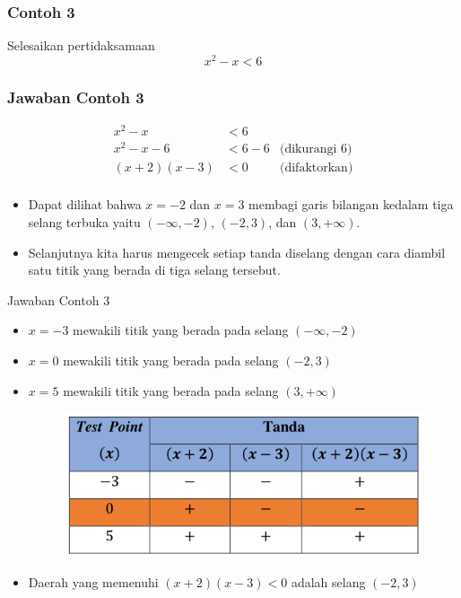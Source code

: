 \documentclass[pdflatex,compress,mathserif]{beamer}
\begin{document}
		\begin{frame}
			\frametitle{Contoh 3}
			Selesaikan pertidaksamaan 
			\begin{equation*}
				x^2 - x < 6
			\end{equation*}
		\end{frame}
	
		\begin{frame}
			\frametitle{Jawaban Contoh 3}
			\begin{align*}
				x^2 - x &< 6 &\\
				x^2 - x - 6 & < 6 - 6 & \text{(dikurangi 6)}\\
				(x+2)(x-3)& <  0 &\text{(difaktorkan)}\\
			\end{align*}
			\begin{itemize}
				\item Dapat dilihat bahwa $ x = -2 $ dan $ x = 3 $ membagi garis bilangan kedalam tiga selang terbuka yaitu $ (-\infty, -2) $, $ (-2,3) $, dan $ (3, +\infty) $.
				\item Selanjutnya kita harus mengecek setiap tanda diselang dengan cara diambil satu titik yang berada di tiga selang tersebut.
			\end{itemize}
		\end{frame}
	
		\begin{frame}{Jawaban Contoh 3}
			\begin{itemize}
				\item $ x = -3 $ mewakili titik yang berada pada selang $ (-\infty, -2) $
				\item $ x = 0 $ mewakili titik yang berada pada selang $ (-2, 3) $
				\item $ x = 5 $ mewakili titik yang berada pada selang $ (3, +\infty) $
				\begin{figure}
					\centering
					\includegraphics[width=0.7\linewidth]{pict/13}
				\end{figure}
				\item Daerah yang memenuhi $ (x+2)(x-3)<0 $ adalah selang $ (-2,3) $
			\end{itemize}
			
		\end{frame}
	
\end{document}
